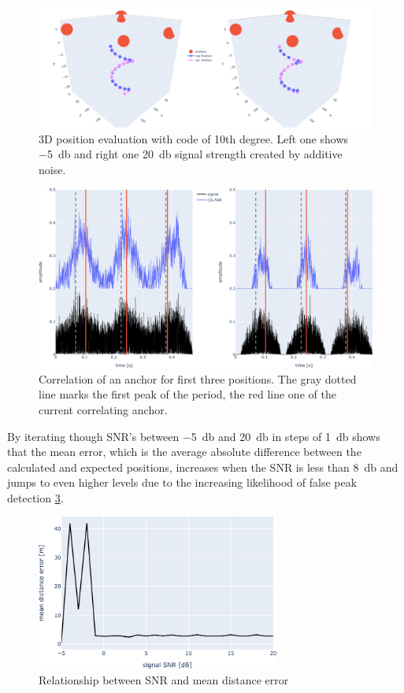 \begin{figure}
	\includegraphics[width=\linewidth]{images/simulation/d10-5snrvs20snr} 
	\caption{3D position evaluation with code of 10th degree. Left one shows \SI{-5}{\decibel} and right one \SI{20}{\decibel} signal strength created by additive noise.}
	\label{fig:3dvs1}
\end{figure}
\begin{figure}
	\includegraphics[width=\linewidth]{images/simulation/d10snr-5vs20lines} 
	\caption{Correlation of an anchor for first three positions. The gray dotted line marks the first peak of the period, the red line one of the current correlating anchor.}
	\label{fig:3dvslines1}
\end{figure}
By iterating though SNR's between \SI{-5}{\decibel} and \SI{20}{\decibel} in steps of \SI{1}{\decibel} shows that the mean error, which is the average absolute difference between the calculated and expected positions, increases when the SNR is less than \SI{8}{\decibel} and jumps to even higher levels due to the increasing likelihood of false peak detection \ref{fig:errorsnr}.
\begin{figure}
	\centering
	\includegraphics[width=8cm]{images/simulation/snrerror1} 
	\caption{Relationship between SNR and mean distance error}
	\label{fig:errorsnr}
\end{figure}
